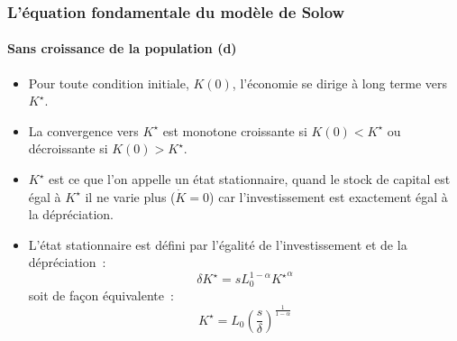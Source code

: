 \documentclass[10pt,notheorems]{beamer}
\theoremstyle{plain}
\theoremstyle{definition} %
\begin{document}
\begin{frame}
  \frametitle{L'équation fondamentale du modèle de Solow}
  \framesubtitle{Sans croissance de la population (d)}

  \bigskip

  \begin{itemize}

  \item Pour toute condition initiale, $K(0)$, l'économie se dirige à long terme vers $K^{\star}$.\newline

  \item La convergence vers $K^{\star}$ est monotone croissante si $K(0)<K^{\star}$ ou décroissante si $K(0)>K^{\star}$.\newline

  \item $K^{\star}$ est ce que l'on appelle un état stationnaire, quand le stock de capital est égal à $K^{\star}$ il ne varie plus ($\dot K = 0$) car l'investissement est exactement égal à la dépréciation.\newline

  \item L'état stationnaire est défini par l'égalité de l'investissement et de la dépréciation~:
    \[
      \delta K^{\star} = s L_0^{1-\alpha}{K^{\star}}^{\alpha}
    \]
    soit de façon équivalente~:
    \[
      K^{\star} = L_0\left(\frac{s}{\delta}\right)^{\frac{1}{1-\alpha}}
    \]
  \end{itemize}

\end{frame}
\end{document}
